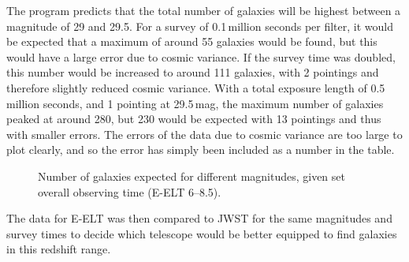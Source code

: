 		The program predicts that the total number of galaxies will be highest between a magnitude of 29 and 29.5. For a survey of 0.1\,million seconds per filter, it would be expected that a maximum of around 55 galaxies would be found, but this would have a large error due to cosmic variance. If the survey time was doubled, this number would be increased to around 111 galaxies, with 2 pointings and therefore slightly reduced cosmic variance. With a total exposure length of 0.5\,million seconds, and 1 pointing at 29.5\,mag, the maximum number of galaxies peaked at around 280, but 230 would be expected with 13 pointings and thus with smaller errors. The errors of the data due to cosmic variance are too large to plot clearly, and so the error has simply been included as a number in the table.
		\begin{figure}[htbp]
			\centering
				\begingroup{}
					\resizebox{0.8\textwidth}{!}{%
						
					}\endgroup
			\caption{Number of galaxies expected for different magnitudes, given set overall observing time (E-ELT 6--8.5).\label{fig:alpha_evolution}}
		\end{figure}

		The data for E-ELT was then compared to JWST for the same magnitudes and survey times to decide which telescope would be better equipped to find galaxies in this redshift range.

